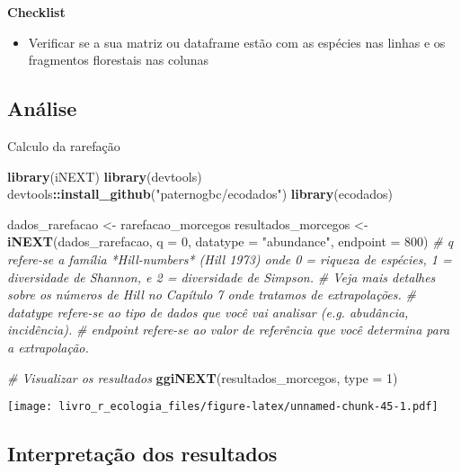 \documentclass[
]{book}
\newenvironment{Shaded}{\begin{snugshade}}{\end{snugshade}}
\newcommand{\CommentTok}[1]{\textcolor[rgb]{0.56,0.35,0.01}{\textit{#1}}}
\newcommand{\DataTypeTok}[1]{\textcolor[rgb]{0.13,0.29,0.53}{#1}}
\newcommand{\DecValTok}[1]{\textcolor[rgb]{0.00,0.00,0.81}{#1}}
\newcommand{\KeywordTok}[1]{\textcolor[rgb]{0.13,0.29,0.53}{\textbf{#1}}}
\newcommand{\NormalTok}[1]{#1}
\newcommand{\OperatorTok}[1]{\textcolor[rgb]{0.81,0.36,0.00}{\textbf{#1}}}
\newcommand{\StringTok}[1]{\textcolor[rgb]{0.31,0.60,0.02}{#1}}
\providecommand{\tightlist}{%
  \setlength{\itemsep}{0pt}\setlength{\parskip}{0pt}}
\begin{document}
\textbf{Checklist}

\begin{itemize}
\tightlist
\item
  Verificar se a sua matriz ou dataframe estão com as espécies nas linhas e os fragmentos florestais nas colunas
\end{itemize}

\hypertarget{anuxe1lise}{%
\subsection{Análise}\label{anuxe1lise}}

Calculo da rarefação

\begin{Shaded}
\begin{Highlighting}[]
\KeywordTok{library}\NormalTok{(iNEXT)}
\KeywordTok{library}\NormalTok{(devtools)}
\NormalTok{devtools}\OperatorTok{::}\KeywordTok{install_github}\NormalTok{(}\StringTok{"paternogbc/ecodados"}\NormalTok{)}
\KeywordTok{library}\NormalTok{(ecodados)}

\NormalTok{dados_rarefacao <-}\StringTok{ }\NormalTok{rarefacao_morcegos}
\NormalTok{resultados_morcegos <-}\StringTok{ }\KeywordTok{iNEXT}\NormalTok{(dados_rarefacao, }\DataTypeTok{q =} \DecValTok{0}\NormalTok{, }\DataTypeTok{datatype =} \StringTok{"abundance"}\NormalTok{, }\DataTypeTok{endpoint =} \DecValTok{800}\NormalTok{)}
\CommentTok{# q refere-se a família *Hill-numbers* (Hill 1973) onde 0 = riqueza de espécies, 1 =  diversidade de Shannon, e 2 = diversidade de Simpson.}
\CommentTok{# Veja mais detalhes sobre os números de Hill no Capítulo 7 onde tratamos de extrapolações.}
\CommentTok{# datatype refere-se ao tipo de dados que você vai analisar (e.g. abudância, incidência).}
\CommentTok{# endpoint refere-se ao valor de referência que você determina para a extrapolação.}

\CommentTok{# Visualizar os resultados }
\KeywordTok{ggiNEXT}\NormalTok{(resultados_morcegos, }\DataTypeTok{type =} \DecValTok{1}\NormalTok{)}
\end{Highlighting}
\end{Shaded}

\texttt{[image: livro\_r\_ecologia\_files/figure-latex/unnamed-chunk-45-1.pdf]}

\hypertarget{interpretauxe7uxe3o-dos-resultados}{%
\subsection{Interpretação dos resultados}\label{interpretauxe7uxe3o-dos-resultados}}
\end{document}

